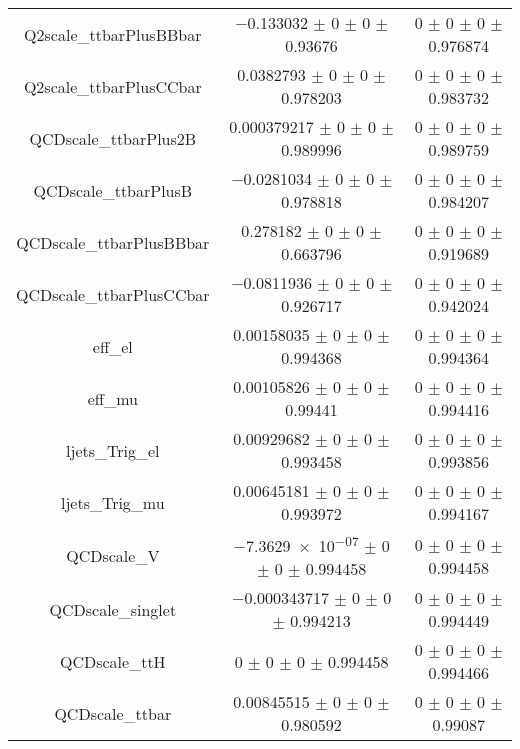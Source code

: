 \begin{table}
\begin{tabular}{ccc}
Q2scale\_ttbarPlusBBbar & \num{-0.133032} $\pm$ \num{0} $\pm$ \num{0} $\pm$ \num{0.93676} & \num{0} $\pm$ \num{0} $\pm$ \num{0} $\pm$ \num{0.976874}\\
Q2scale\_ttbarPlusCCbar & \num{0.0382793} $\pm$ \num{0} $\pm$ \num{0} $\pm$ \num{0.978203} & \num{0} $\pm$ \num{0} $\pm$ \num{0} $\pm$ \num{0.983732}\\
QCDscale\_ttbarPlus2B & \num{0.000379217} $\pm$ \num{0} $\pm$ \num{0} $\pm$ \num{0.989996} & \num{0} $\pm$ \num{0} $\pm$ \num{0} $\pm$ \num{0.989759}\\
QCDscale\_ttbarPlusB & \num{-0.0281034} $\pm$ \num{0} $\pm$ \num{0} $\pm$ \num{0.978818} & \num{0} $\pm$ \num{0} $\pm$ \num{0} $\pm$ \num{0.984207}\\
QCDscale\_ttbarPlusBBbar & \num{0.278182} $\pm$ \num{0} $\pm$ \num{0} $\pm$ \num{0.663796} & \num{0} $\pm$ \num{0} $\pm$ \num{0} $\pm$ \num{0.919689}\\
QCDscale\_ttbarPlusCCbar & \num{-0.0811936} $\pm$ \num{0} $\pm$ \num{0} $\pm$ \num{0.926717} & \num{0} $\pm$ \num{0} $\pm$ \num{0} $\pm$ \num{0.942024}\\
eff\_el & \num{0.00158035} $\pm$ \num{0} $\pm$ \num{0} $\pm$ \num{0.994368} & \num{0} $\pm$ \num{0} $\pm$ \num{0} $\pm$ \num{0.994364}\\
eff\_mu & \num{0.00105826} $\pm$ \num{0} $\pm$ \num{0} $\pm$ \num{0.99441} & \num{0} $\pm$ \num{0} $\pm$ \num{0} $\pm$ \num{0.994416}\\
ljets\_Trig\_el & \num{0.00929682} $\pm$ \num{0} $\pm$ \num{0} $\pm$ \num{0.993458} & \num{0} $\pm$ \num{0} $\pm$ \num{0} $\pm$ \num{0.993856}\\
ljets\_Trig\_mu & \num{0.00645181} $\pm$ \num{0} $\pm$ \num{0} $\pm$ \num{0.993972} & \num{0} $\pm$ \num{0} $\pm$ \num{0} $\pm$ \num{0.994167}\\
QCDscale\_V & \num{-7.3629e-07} $\pm$ \num{0} $\pm$ \num{0} $\pm$ \num{0.994458} & \num{0} $\pm$ \num{0} $\pm$ \num{0} $\pm$ \num{0.994458}\\
QCDscale\_singlet & \num{-0.000343717} $\pm$ \num{0} $\pm$ \num{0} $\pm$ \num{0.994213} & \num{0} $\pm$ \num{0} $\pm$ \num{0} $\pm$ \num{0.994449}\\
QCDscale\_ttH & \num{0} $\pm$ \num{0} $\pm$ \num{0} $\pm$ \num{0.994458} & \num{0} $\pm$ \num{0} $\pm$ \num{0} $\pm$ \num{0.994466}\\
QCDscale\_ttbar & \num{0.00845515} $\pm$ \num{0} $\pm$ \num{0} $\pm$ \num{0.980592} & \num{0} $\pm$ \num{0} $\pm$ \num{0} $\pm$ \num{0.99087}\\

\end{tabular}
\end{table}
